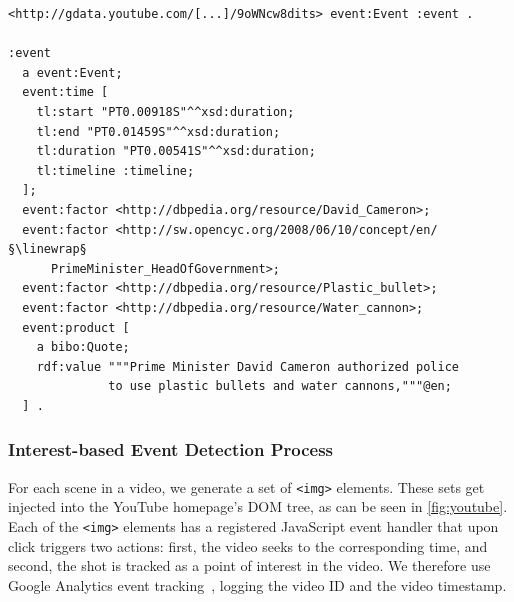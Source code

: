 \documentclass[runningheads,a4paper]{llncs}
\newcommand{\linewrap}{\raisebox{-.6ex}{\textcolor{grey}{$\hookleftarrow$}}}
\begin{document}
\begin{lstlisting}[caption=Exemplary extracted named entities from a YouTube video on the London riots., label=code:semwebvid, float=htb!, escapechar=§]
<http://gdata.youtube.com/[...]/9oWNcw8dits> event:Event :event .

:event
  a event:Event;
  event:time [
    tl:start "PT0.00918S"^^xsd:duration;
    tl:end "PT0.01459S"^^xsd:duration;
    tl:duration "PT0.00541S"^^xsd:duration;
    tl:timeline :timeline;
  ];
  event:factor <http://dbpedia.org/resource/David_Cameron>;
  event:factor <http://sw.opencyc.org/2008/06/10/concept/en/§\linewrap§
      PrimeMinister_HeadOfGovernment>;
  event:factor <http://dbpedia.org/resource/Plastic_bullet>;
  event:factor <http://dbpedia.org/resource/Water_cannon>;
  event:product [
    a bibo:Quote;
    rdf:value """Prime Minister David Cameron authorized police
              to use plastic bullets and water cannons,"""@en;
  ] .
\end{lstlisting} 

\subsubsection{Interest-based Event Detection Process}
For each scene in a video, we generate a set of \texttt{<img>} elements. These sets get injected into the YouTube homepage's DOM tree, as can be seen in \autoref{fig:youtube}. Each of the \texttt{<img>} elements has a registered JavaScript event handler that upon click triggers two actions: first, the video seeks to the corresponding time, and second, the shot is tracked as a point of interest in the video. We therefore use Google Analytics event tracking~\cite{analyticsevent}, logging the video ID and the video timestamp.
\end{document}
